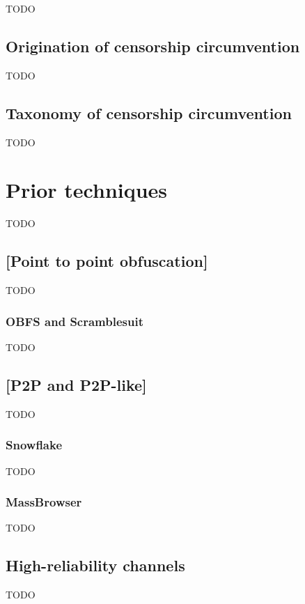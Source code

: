 \documentclass[12pt]{report}
\begin{document}
TODO

\subsection{Origination of censorship circumvention}

TODO

\subsection{Taxonomy of censorship circumvention}

TODO

\section{Prior techniques}

TODO

\subsection{[Point to point obfuscation]}

TODO

\subsubsection{OBFS and Scramblesuit}

TODO

\subsection{[P2P and P2P-like]}

TODO

\subsubsection{Snowflake}

TODO

\subsubsection{MassBrowser}

TODO

\subsection{High-reliability channels}

TODO
\end{document}
